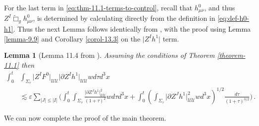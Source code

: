 \documentclass[11pt, a4paper]{amsart}
\numberwithin{equation}{section}
\newtheorem{lemma}[theorem]{Lemma}
\numberwithin{theorem}{section}
\newcommand{\p}{\partial}
\newcommand{\mn}{{\mu \nu}}
\newcommand{\tbox}{\widetilde{\Box}}
\newcommand{\UU}{{\mathcal{U} \mathcal{U}}}
\begin{document}
For the last term in \eqref{eq:thm-11.1-terms-to-control}, recall that $h^0_\mn$, and thus $Z^I \tbox_g h^0_\mn$, is determined by calculating directly from the definition in \eqref{eq:def-h0-h1}. Thus the next Lemma follows identically from \cite{LR:04}, with the proof using Lemma \ref{lemma-9.9} and Corollary \ref{corol-13.3} on the $\vert Z^I h^1 \vert$ term. 
\begin{lemma}[Lemma 11.4 from \cite{LR:04}] \label{lemma-11.4}
Assuming the conditions of Theorem \ref{theorem-11.1} then
\begin{align*}
\int_0^t & \int_{\Sigma_\tau} \vert Z^I F^0 \vert_\UU  \vert \p Z^I h^1 \vert_\UU w d \tau d^3 x \\ &
\lesssim \varepsilon \sum_{\vert J \vert \leq \vert I \vert}  \Big( \int_0^t \int_{\Sigma_\tau} \frac{\vert \p Z^J h^1 \vert^2_\UU}{(1+\tau)^2} w d \tau d^3 x+ \int_0^t \left( \int_{\Sigma_\tau} \vert \p Z^J h^1 \vert^2_\UU w d^3x \right)^{1/2} \frac{d \tau}{(1+\tau)^{3/2}} \Big) \,.
\end{align*}
\end{lemma}
We can now complete the proof of the main theorem. 
\end{document}
